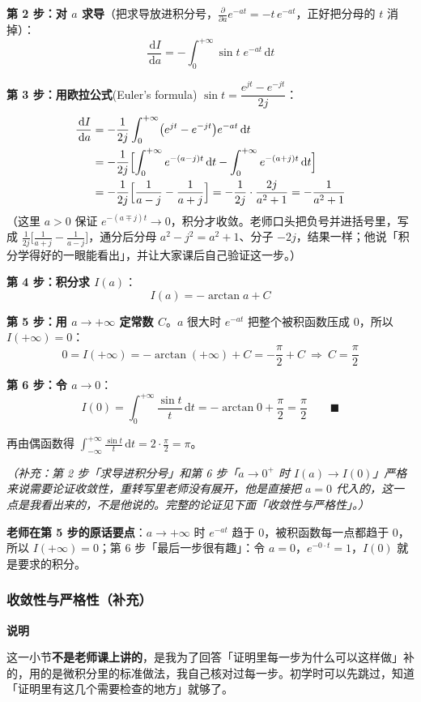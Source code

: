 \documentclass[UTF8,a4paper,11pt]{ctexart}
\newenvironment{note}{\begin{notebox}\textbf{说明}\par\smallskip}{\end{notebox}}
\renewcommand{\d}{\,\mathrm{d}}
\begin{document}
\textbf{第 2 步：对 $a$ 求导}（把求导放进积分号，$\frac{\partial}{\partial a}e^{-at}=-t\,e^{-at}$，正好把分母的 $t$ 消掉）：
\[
\frac{\d I}{\d a}=-\int_0^{+\infty}\sin t\;e^{-at}\d t
\]

\textbf{第 3 步：用欧拉公式}(Euler's formula) $\sin t=\dfrac{e^{jt}-e^{-jt}}{2j}$：
\begin{align*}
\frac{\d I}{\d a}
&=-\frac{1}{2j}\int_0^{+\infty}\bigl(e^{jt}-e^{-jt}\bigr)e^{-at}\d t\\
&=-\frac{1}{2j}\Bigl[\int_0^{+\infty}e^{-(a-j)t}\d t-\int_0^{+\infty}e^{-(a+j)t}\d t\Bigr]\\
&=-\frac{1}{2j}\Bigl[\frac{1}{a-j}-\frac{1}{a+j}\Bigr]
=-\frac{1}{2j}\cdot\frac{2j}{a^2+1}
=-\frac{1}{a^2+1}
\end{align*}
（这里 $a>0$ 保证 $e^{-(a\mp j)t}\to0$，积分才收敛。老师口头把负号并进括号里，写成 $\frac{1}{2j}\bigl[\frac{1}{a+j}-\frac{1}{a-j}\bigr]$，通分后分母 $a^2-j^2=a^2+1$、分子 $-2j$，结果一样；他说「积分学得好的一眼能看出」，并让大家课后自己验证这一步。）

\textbf{第 4 步：积分求 $I(a)$}：
\[
I(a)=-\arctan a+C
\]

\textbf{第 5 步：用 $a\to+\infty$ 定常数 $C$}。$a$ 很大时 $e^{-at}$ 把整个被积函数压成 $0$，所以 $I(+\infty)=0$：
\[
0=I(+\infty)=-\arctan(+\infty)+C=-\frac{\pi}{2}+C\ \Longrightarrow\ C=\frac{\pi}{2}
\]

\textbf{第 6 步：令 $a\to 0$}：
\[
I(0)=\int_0^{+\infty}\frac{\sin t}{t}\d t=-\arctan 0+\frac{\pi}{2}=\frac{\pi}{2}\qquad\blacksquare
\]

再由偶函数得 $\int_{-\infty}^{+\infty}\frac{\sin t}{t}\d t=2\cdot\frac\pi2=\pi$。

\emph{（补充：第 2 步「求导进积分号」和第 6 步「$a\to0^{+}$ 时 $I(a)\to I(0)$」严格来说需要论证收敛性，重转写里老师没有展开，他是直接把 $a=0$ 代入的，这一点是我看出来的，不是他说的。完整的论证见下面「收敛性与严格性」。）}\par\smallskip\textbf{老师在第 5 步的原话要点}：$a\to+\infty$ 时 $e^{-at}$ 趋于 0，被积函数每一点都趋于 0，所以 $I(+\infty)=0$；第 6 步「最后一步很有趣」：令 $a=0$，$e^{-0\cdot t}=1$，$I(0)$ 就是要求的积分。

\subsubsection*{收敛性与严格性（补充）}
\begin{note}
这一小节\textbf{不是老师课上讲的}，是我为了回答「证明里每一步为什么可以这样做」补的，用的是微积分里的标准做法，我自己核对过每一步。初学时可以先跳过，知道「证明里有这几个需要检查的地方」就够了。
\end{note}
\end{document}
